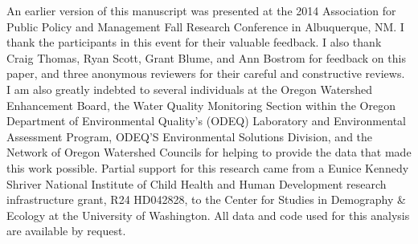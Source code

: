 \documentclass[12pt,a4paper,titlepage]{article}
\begin{document}
An earlier version of this manuscript was presented at the 2014 Association for Public Policy and Management Fall Research Conference in Albuquerque, NM. I thank the participants in this event for their valuable feedback. I also thank Craig Thomas, Ryan Scott, Grant Blume, and Ann Bostrom for feedback on this paper, and three anonymous reviewers for their careful and constructive reviews. I am also greatly indebted to several individuals at the Oregon Watershed Enhancement Board, the Water Quality Monitoring Section within the Oregon Department of Environmental Quality’s (ODEQ) Laboratory and Environmental Assessment Program, ODEQ’S Environmental Solutions Division, and the Network of Oregon Watershed Councils for helping to provide the data that made this work possible. Partial support for this research came from a Eunice Kennedy Shriver National Institute of Child Health and Human Development research infrastructure grant, R24 HD042828, to the Center for Studies in Demography \& Ecology at the University of Washington. All data and code used for this analysis are available by request. 

\printbibliography
\end{document}
